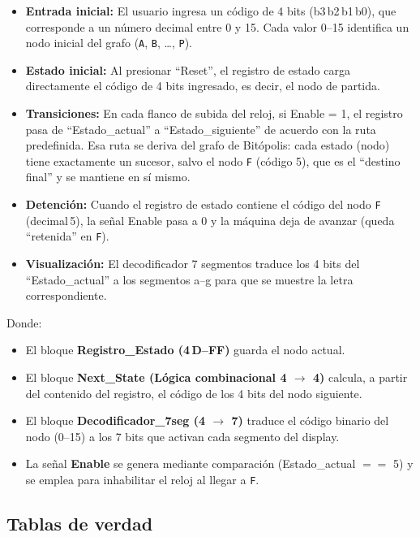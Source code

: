 \documentclass[12pt]{article}
\begin{document}
\begin{itemize}
  \item \textbf{Entrada inicial:} El usuario ingresa un código de 4 bits (b3\,b2\,b1\,b0), que corresponde a un número decimal entre 0 y 15. Cada valor 0–15 identifica un nodo inicial del grafo (\texttt{A}, \texttt{B}, …, \texttt{P}).
  \item \textbf{Estado inicial:} Al presionar “Reset”, el registro de estado carga directamente el código de 4 bits ingresado, es decir, el nodo de partida.
  \item \textbf{Transiciones:} En cada flanco de subida del reloj, si Enable = 1, el registro pasa de “Estado\_actual” a “Estado\_siguiente” de acuerdo con la ruta predefinida. Esa ruta se deriva del grafo de Bitópolis: cada estado (nodo) tiene exactamente un sucesor, salvo el nodo \texttt{F} (código 5), que es el “destino final” y se mantiene en sí mismo.
  \item \textbf{Detención:} Cuando el registro de estado contiene el código del nodo \texttt{F} (decimal\,5), la señal Enable pasa a 0 y la máquina deja de avanzar (queda “retenida” en \texttt{F}).
  \item \textbf{Visualización:} El decodificador 7 segmentos traduce los 4 bits del “Estado\_actual” a los segmentos a–g para que se muestre la letra correspondiente.  
\end{itemize}


\begin{center}
\end{center}

Donde:
\begin{itemize}
  \item El bloque \textbf{Registro\_Estado (4\,D–FF)} guarda el nodo actual.  
  \item El bloque \textbf{Next\_State (Lógica combinacional 4 $\to$ 4)} calcula, a partir del contenido del registro, el código de los 4 bits del nodo siguiente.  
  \item El bloque \textbf{Decodificador\_7seg (4 $\to$ 7)} traduce el código binario del nodo (0–15) a los 7 bits que activan cada segmento del display.  
  \item La señal \textbf{Enable} se genera mediante comparación (Estado\_actual $==$ 5) y se emplea para inhabilitar el reloj al llegar a \texttt{F}.  
\end{itemize}

\subsection{Tablas de verdad}
\end{document}
